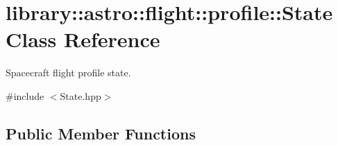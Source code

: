 \hypertarget{classlibrary_1_1astro_1_1flight_1_1profile_1_1_state}{}\section{library\+:\+:astro\+:\+:flight\+:\+:profile\+:\+:State Class Reference}
\label{classlibrary_1_1astro_1_1flight_1_1profile_1_1_state}


Spacecraft flight profile state.  




{\ttfamily \#include $<$State.\+hpp$>$}

\subsection*{Public Member Functions}
